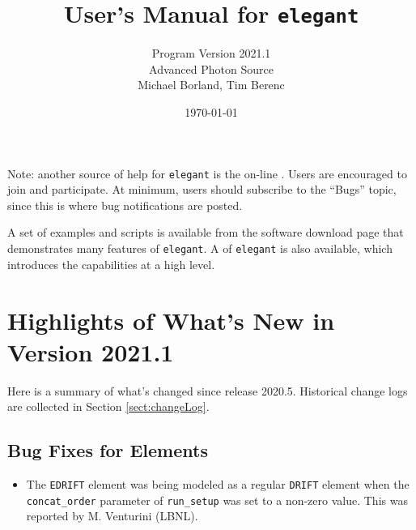 \documentclass[11pt]{article}
\begin{document}
\title{User's Manual for {\tt elegant}}
\author{Program Version 2021.1\\Advanced Photon Source\\Michael Borland, Tim Berenc\\ \date{\today}}
\maketitle

Note: another source of help for {\tt elegant} is the on-line
.
Users are encouraged to join and participate.  At minimum, users should subscribe to the ``Bugs'' topic,
since this is where bug notifications are posted.

A set of examples and scripts is 
available from the software download page that demonstrates many features of {\tt elegant}.  A  of {\tt elegant} is also available, which introduces the capabilities
at a high level.

\section{Highlights of What's New in Version 2021.1}

Here is a summary of what's changed since release 2020.5.  Historical change logs are collected in Section
\ref{sect:changeLog}.

\subsection{Bug Fixes for Elements}

\begin{itemize}
\item The \verb|EDRIFT| element was being modeled as a regular \verb|DRIFT| element when the \verb|concat_order| parameter
  of \verb|run_setup| was set to a non-zero value. This was reported by M. Venturini (LBNL).
\end{itemize}
\end{document}
